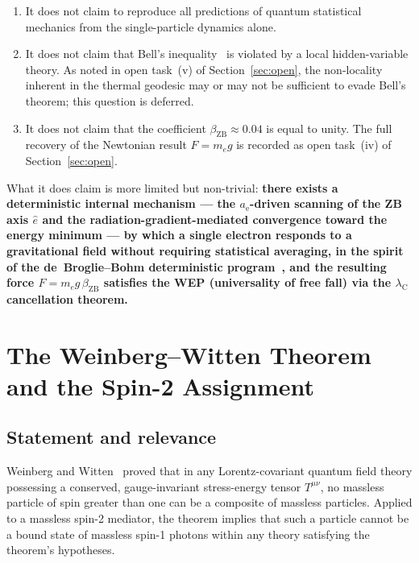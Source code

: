 \documentclass[%
 reprint, amsmath,amssymb, aps, prb, ]{revtex4-2}
\numberwithin{equation}{section}
\newcommand{\lambdaC}{\lambda_{\mathrm{C}}}
\newcommand{\betaZB}{\beta_{\mathrm{ZB}}}
\newcommand{\anom}{a_{\mathrm{e}}}
\begin{document}
\begin{enumerate}[label=(\roman*), leftmargin=2em]
\item It does not claim to reproduce all predictions of quantum statistical mechanics from the single-particle dynamics alone.
\item It does not claim that Bell's inequality~\cite{bell1964} is violated by a local hidden-variable theory. As noted in open task~(v) of Section~\ref{sec:open}, the non-locality inherent in the thermal geodesic may or may not be sufficient to evade Bell's theorem; this question is deferred.
\item It does not claim that the coefficient $\betaZB \approx 0.04$ is equal to unity. The full recovery of the Newtonian result $F = m_e g$ is recorded as open task~(iv) of Section~\ref{sec:open}.
\end{enumerate}

What it does claim is more limited but non-trivial: \textbf{there exists a deterministic internal mechanism --- the $\anom$-driven scanning of the ZB axis $\hat{e}$ and the radiation-gradient-mediated convergence toward the energy minimum --- by which a single electron responds to a gravitational field without requiring statistical averaging, in the spirit of the de~Broglie--Bohm deterministic program~\cite{bohm1952}, and the resulting force $F = m_e g\,\betaZB$ satisfies the WEP (universality of free fall) via the $\lambdaC$ cancellation theorem.}

\section{The Weinberg--Witten Theorem and the Spin-2 Assignment}
\label{app:WW}

\subsection{Statement and relevance}

Weinberg and Witten~\cite{WeinbergWitten1980} proved that in any Lorentz-covariant quantum field theory possessing a conserved, gauge-invariant stress-energy tensor $T^{\mu\nu}$, no massless particle of spin greater than one can be a composite of massless particles. Applied to a massless spin-2 mediator, the theorem implies that such a particle cannot be a bound state of massless spin-1 photons within any theory satisfying the theorem's hypotheses.
\end{document}
